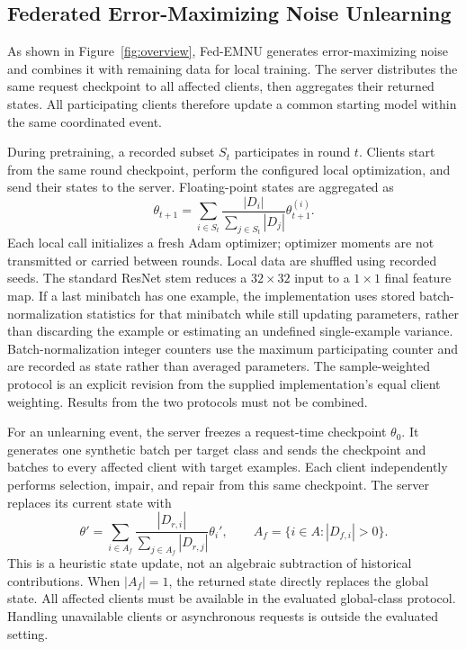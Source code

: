 \documentclass[software,article,submit,moreauthors]{Definitions/mdpi}
\begin{document}
\subsection{Federated Error-Maximizing Noise Unlearning}
\label{sec:protocol}
As shown in Figure~\ref{fig:overview}, Fed-EMNU generates error-maximizing noise
and combines it with remaining data for local training. The server distributes
the same request checkpoint to all affected clients, then aggregates their
returned states. All participating clients therefore update a common starting
model within the same coordinated event.

During pretraining, a recorded subset $S_t$ participates in round $t$. Clients
start from the same round checkpoint, perform the configured local optimization,
and send their states to the server. Floating-point states are aggregated as
\begin{equation}
\theta_{t+1}=\sum_{i\in S_t}\frac{|D_i|}{\sum_{j\in S_t}|D_j|}
\theta_{t+1}^{(i)}.
\label{eq:fedavg}
\end{equation}
Each local call initializes a fresh Adam optimizer; optimizer moments are not
transmitted or carried between rounds. Local data are shuffled using recorded
seeds. The standard ResNet stem reduces a $32\times32$ input to a $1\times1$
final feature map. If a last minibatch has one example, the implementation uses
stored batch-normalization statistics for that minibatch while still updating
parameters, rather than discarding the example or estimating an undefined
single-example variance.
Batch-normalization integer counters use the maximum participating counter and
are recorded as state rather than averaged parameters. The sample-weighted
protocol is an explicit revision from the supplied implementation's equal
client weighting. Results from the two protocols must not be combined.

For an unlearning event, the server freezes a request-time checkpoint
$\theta_0$. It generates one synthetic batch per target class and sends the
checkpoint and batches to every affected client with target examples. Each
client independently performs selection, impair, and repair from this same
checkpoint. The server replaces its current state with
\begin{equation}
\theta'=\sum_{i\in A_f}\frac{|D_{r,i}|}{\sum_{j\in A_f}|D_{r,j}|}
\theta_i', \qquad A_f=\{i\in A:|D_{f,i}|>0\}.
\label{eq:unlearnagg}
\end{equation}
This is a heuristic state update, not an algebraic subtraction of historical
contributions. When $|A_f|=1$, the returned state directly replaces the global
state. All affected clients must be available in the evaluated global-class
protocol. Handling unavailable clients or asynchronous requests is outside the
evaluated setting.
\end{document}
